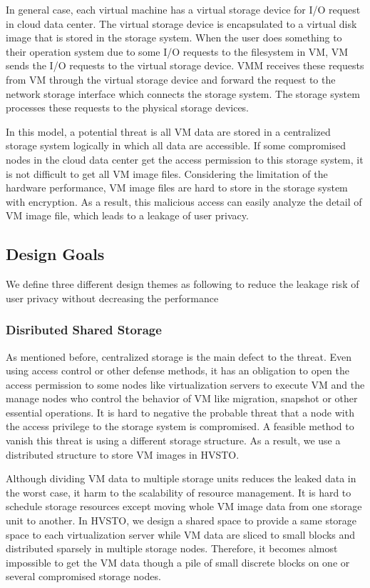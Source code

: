 \documentclass[conference]{IEEEtran}
\begin{document}
In general case, each virtual machine has a virtual storage device for I/O request in cloud data center. The virtual storage device is encapsulated to a virtual disk image that is stored in the storage system. When the user does something to their operation system due to some I/O requests to the filesystem in VM, VM sends the I/O requests to the virtual storage device. VMM receives these requests from VM through the virtual storage device and forward the request to the network storage interface which connects the storage system. The storage system processes these requests to the physical storage devices. 


In this model, a potential threat is all VM data are stored in a centralized storage system logically in which all data are accessible. If some compromised nodes in the cloud data center get the access permission to this storage system, it is not difficult to get all VM image files. Considering the limitation of the hardware performance, VM image files are hard to store in the storage system with encryption. As a result, this malicious access can easily analyze the detail of VM image file, which leads to a leakage of user privacy.






\subsection{Design Goals}
We define three different design themes as following to reduce the leakage risk of user privacy without decreasing the performance
\subsubsection{Disributed Shared Storage}
As mentioned before, centralized storage is the main defect to the threat. Even using access control or other defense methods, it has an obligation to open the access permission to some nodes like virtualization servers to execute VM and the manage nodes who control the behavior of VM like migration, snapshot or other essential operations. It is hard to negative the probable threat that a node with the access privilege to the storage system is compromised. A feasible method to vanish this threat is using a different storage structure. As a result, we use a distributed structure to store VM images in HVSTO.



Although dividing VM data to multiple storage units reduces the leaked data in the worst case, it harm to the scalability of resource management. It is hard to schedule storage resources except moving whole VM image data from one storage unit to another. In HVSTO, we design a shared space to provide a same storage space to each virtualization server while VM data are sliced to small blocks and distributed sparsely in multiple storage nodes. Therefore, it becomes almost impossible to get the VM data though a pile of small discrete blocks on one or several compromised storage nodes.  
\end{document}
